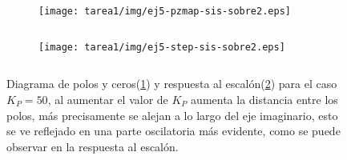 \begin{ejercicio}
\begin{itemize}
    \begin{figure}[H]
      \centering
      \begin{subfigure}{0.48\textwidth}
        \centering
        \texttt{[image: tarea1/img/ej5-pzmap-sis-sobre2.eps]}
        \caption{$\quad$}
        \label{ej5:img5:a}
      \end{subfigure}
      \begin{subfigure}{0.48\textwidth}
        \centering
        \texttt{[image: tarea1/img/ej5-step-sis-sobre2.eps]}
        \caption{$\quad$}
        \label{ej5:img5:b}
      \end{subfigure}
      \caption{Diagrama de polos y ceros(\ref{ej5:img5:a}) y respuesta al escalón(\ref{ej5:img5:b}) para el caso $K_P = 50$, al aumentar el valor de $K_P$ aumenta la distancia entre los polos, más precisamente se alejan a lo largo del eje imaginario, esto se ve reflejado en una parte oscilatoria más evidente, como se puede observar en la respuesta al escalón.}
      \label{ej5:img5}
    \end{figure}
  \end{itemize}

\end{ejercicio}